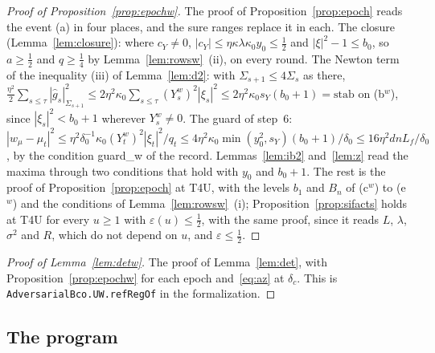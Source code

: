 \documentclass[11pt]{amsart}
\theoremstyle{definition}
\numberwithin{equation}{section}
\begin{document}
\begin{proof}[Proof of Proposition~\ref{prop:epochw}]
The proof of Proposition~\ref{prop:epoch} reads the event (a) in four places, and the sure ranges replace it in each. The closure (Lemma~\ref{lem:closure}): where $c_Y\ne0$, $|c_Y|\le\eta\kappa\lambda\kappa_0y_0\le\frac12$ and $|\xi|^2-1\le b_0$, so $a\ge\frac12$ and $q\ge\frac14$ by Lemma~\ref{lem:rowsw}~(ii), on every round. The Newton term of the inequality (iii) of Lemma~\ref{lem:d2}: with $\Sigma_{s+1}\le4\Sigma_s$ as there, $\frac{\eta^2}2\sum_{s\le\tau}|\hat g_s|^2_{\Sigma_{s+1}}\le2\eta^2\kappa_0\sum_{s\le\tau}(Y^w_s)^2|\xi_s|^2\le2\eta^2\kappa_0s_Y(b_0+1)=\mathrm{stab}$ on (b$^w$), since $|\xi_s|^2<b_0+1$ wherever $Y^w_s\ne0$. The guard of step~6: $|w_\mu-\mu_t|^2\le\eta^2\delta_0^{-1}\kappa_0(Y^w_t)^2|\xi_t|^2/q_t\le4\eta^2\kappa_0\min(y_0^2,s_Y)(b_0+1)/\delta_0\le16\eta^2dnL_f/\delta_0$, by the condition guard\_w of the record. Lemmas~\ref{lem:ib2} and~\ref{lem:z} read the maxima through two conditions that hold with $y_0$ and $b_0+1$. The rest is the proof of Proposition~\ref{prop:epoch} at T4U, with the levels $b_1$ and $B_n$ of (c$^w$) to (e$^w$) and the conditions of Lemma~\ref{lem:rowsw}~(i); Proposition~\ref{prop:sifacts} holds at T4U for every $u\ge1$ with $\varepsilon(u)\le\frac12$, with the same proof, since it reads $L$, $\lambda$, $\sigma^2$ and $R$, which do not depend on $u$, and $\varepsilon\le\frac12$.
\end{proof}

\begin{proof}[Proof of Lemma~\ref{lem:detw}]
The proof of Lemma~\ref{lem:det}, with Proposition~\ref{prop:epochw} for each epoch and~\eqref{eq:az} at $\delta_c$. This is \texttt{AdversarialBco.\allowbreak UW.\allowbreak refRegOf} in the formalization.
\end{proof}

\subsection*{The program}
\end{document}
